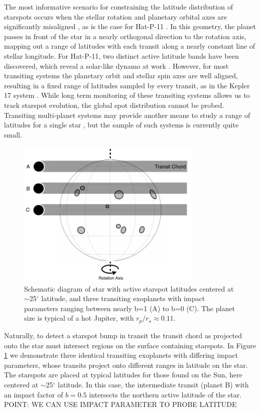 \documentclass[preprint2]{aastex62}
\begin{document}
The most informative scenario for constraining the latitude distribution of starspots occurs when the stellar rotation and planetary orbital axes are significantly misaligned \citep{llama2012}, as is the case for Hat-P-11 \citep{sanchis-ojeda2011}. In this geometry, the planet passes in front of the star in a nearly orthogonal direction to the rotation axis, mapping out a range of latitudes with each transit along a nearly constant line of stellar longitude. For Hat-P-11, two distinct active latitude bands have been discovered, which reveal a solar-like dynamo at work \citep{morris2017}. However, for most transiting systems the planetary orbit and stellar spin axes are well aligned, resulting in a fixed range of latitudes sampled by every transit, as in the Kepler 17 system \citep{davenport_phd}. While long term monitoring of these transiting systems allows us to track starspot evolution, the global spot distribution cannot be probed. Transiting multi-planet systems may provide another means to study a range of latitudes for a single star \citep[e.g. Kepler 186; ][]{kepler186f}, but the sample of such systems is currently quite small.


\begin{figure}[!t]
\centering
\includegraphics[width=3.5in]{diagram1}
\caption{
Schematic diagram of star with active starspot latitudes centered at $\sim$25$^\circ$ latitude, and three transiting exoplanets with impact parameters ranging between nearly b=1 (A) to  b=0 (C). The planet size is typical of a hot Jupiter, with $r_p/r_\star\approx 0.11$.
}
\label{fig:diagram1}
\end{figure}


Naturally, to detect a starspot bump in transit the transit chord as projected onto the star must intersect regions on the surface containing starspots. In Figure \ref{fig:diagram1} we demonstrate three identical transiting exoplanets with differing impact parameters, whose transits project onto different ranges in latitude on the star. The starspots are placed at typical latitudes for those found on the Sun, here centered at $\sim$25$^\circ$ latitude. In this case, the intermediate transit (planet B) with an impact factor of $b=0.5$ intersects the northern active latitude of the star. 
POINT: WE CAN USE IMPACT PARAMETER TO PROBE LATITUDE
\end{document}
